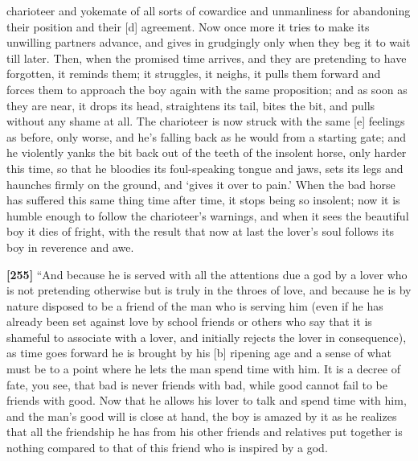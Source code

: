 charioteer and yokemate of all sorts of cowardice and unmanliness for
abandoning their position and their {[}d{]} agreement. Now once more it
tries to make its unwilling partners advance, and gives in grudgingly
only when they beg it to wait till later. Then, when the promised time
arrives, and they are pretending to have forgotten, it reminds them; it
struggles, it neighs, it pulls them forward and forces them to approach
the boy again with the same proposition; and as soon as they are near,
it drops its head, straightens its tail, bites the bit, and pulls
without any shame at all. The charioteer is now struck with the same
{[}e{]} feelings as before, only worse, and he's falling back as he
would from a starting gate; and he violently yanks the bit back out of
the teeth of the insolent horse, only harder this time, so that he
bloodies its foul-speaking tongue and jaws, sets its legs and haunches
firmly on the ground, and ‘gives it over to
pain.' When the bad
horse has suffered this same thing time after time, it stops being so
insolent; now it is humble enough to follow the charioteer's warnings,
and when it sees the beautiful boy it dies of fright, with the result
that now at last the lover's soul follows its boy in reverence and awe.

{\bf {[}255{]}} “And because he is served with all the attentions due a
god by a lover who is not pretending otherwise but is truly in the
throes of love, and because he is by nature disposed to be a friend of
the man who is serving him (even if he has already been set against love
by school friends or others who say that it is shameful to associate
with a lover, and initially rejects the lover in consequence), as time
goes forward he is brought by his {[}b{]} ripening age and a sense of
what must be to a point where he lets the man spend time with him. It is
a decree of fate, you see, that bad is never friends with bad, while
good cannot fail to be friends with good. Now that he allows his lover
to talk and spend time with him, and the man's good will is close at
hand, the boy is amazed by it as he realizes that all the friendship he
has from his other friends and relatives put together is nothing
compared to that of this friend who is inspired by a god.

